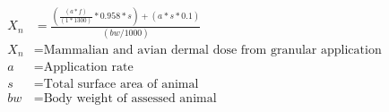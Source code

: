 \documentclass[fleqn, oneside, 11pt]{article}%
\begin{document}
\begin{preview}
\begin{align*}%
X_{n} & = \frac{\left(\frac{\left(a*f\right)}{\left(1*1300\right)}*0.958*s\right)+\left(a*s*0.1\right)}{\left(bw/1000\right)} \nonumber \\
X_{n} & =  \text{Mammalian and avian dermal dose from granular application} \nonumber \\
a & =  \text{Application rate} \nonumber \\
s & =  \text{Total surface area of animal} \nonumber \\
bw & =  \text{Body weight of assessed animal} \nonumber \\
\end{align*} 
\end{preview}
\end{document}

